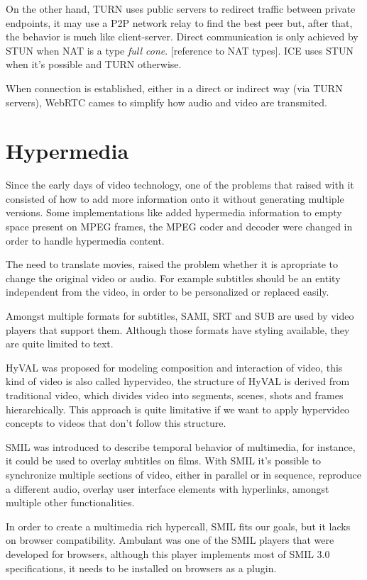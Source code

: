 \documentclass[11pt,twocolumn]{article}
\begin{document}
On the other hand, TURN uses public servers to redirect traffic between private endpoints, it may use a P2P network relay to find the best peer but, after that, the behavior is much like client-server. Direct communication is only achieved by STUN when NAT is a type \textit{full cone}. {\color{red} [reference to NAT types]}. ICE uses STUN when it's possible and TURN otherwise.

When connection is established, either in a direct or indirect way (via TURN servers), WebRTC cames to simplify how audio and video are transmited. 

\section{Hypermedia}

  Since the early days of video technology, one of the problems that raised with it consisted of how to add more information onto it without generating multiple versions. Some implementations like \cite{embedded} added hypermedia information to empty space present on MPEG frames, the MPEG coder and decoder were changed in order to handle hypermedia content.

  The need to translate movies, raised the problem whether it is apropriate to change the original video or audio. For example subtitles should be an entity independent from the video, in order to be personalized or replaced easily.
 
  Amongst multiple formats for subtitles, SAMI, SRT and SUB are used by video players that support them. Although those formats have styling available, they are quite limited to text. 

  HyVAL\cite{hyval} was proposed for modeling composition and interaction of video, this kind of video is also called hypervideo, the structure of HyVAL is derived from traditional video, which divides video into segments, scenes, shots and frames hierarchically. This approach is quite limitative if we want to apply hypervideo concepts to videos that don't follow this structure.

  SMIL was introduced to describe temporal behavior of multimedia, for instance, it could be used to overlay subtitles on films. With SMIL it's possible to synchronize multiple sections of video, either in parallel or in sequence, reproduce a different audio, overlay user interface elements with hyperlinks, amongst multiple other functionalities.

  In order to create a multimedia rich hypercall, SMIL fits our goals, but it lacks on browser compatibility. Ambulant\cite{ambulant} was one of the SMIL players that were developed for browsers, although this player implements most of SMIL 3.0 specifications, it needs to be installed on browsers as a plugin.
\end{document}
